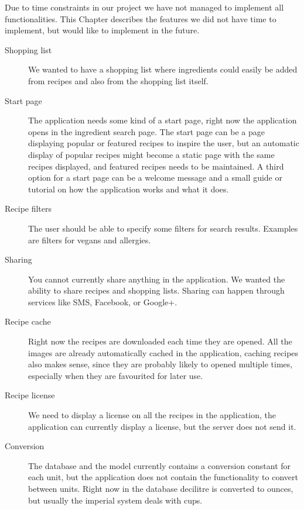 Due to time constraints in our project we have not managed to implement all functionalities. This Chapter describes the features we did not have time to implement, but would like to implement in the future.

\begin{description}
\item[Shopping list] We wanted to have a shopping list where ingredients could easily be added from recipes and also from the shopping list itself.

\item[Start page] The application needs some kind of a start page, right now the application opens in the ingredient search page. The start page can be a page displaying popular or featured recipes to inspire the user, but an automatic display of popular recipes might become a static page with the same recipes displayed, and featured recipes needs to be maintained. A third option for a start page can be a welcome message and a small guide or tutorial on how the application works and what it does.

\item[Recipe filters] The user should be able to specify some filters for search results. Examples are filters for vegans and allergies.

\item[Sharing] You cannot currently share anything in the application. We wanted the ability to share recipes and shopping lists. Sharing can happen through services like SMS, Facebook, or Google+.

\item[Recipe cache] Right now the recipes are downloaded each time they are opened. All the images are already automatically cached in the application, caching recipes also makes sense, since they are probably likely to opened multiple times, especially when they are favourited for later use.

\item[Recipe license] We need to display a license on all the recipes in the application, the application can currently display a license, but the server does not send it.

\item[Conversion] The database and the model currently contains a conversion constant for each unit, but the application does not contain the functionality to convert between units. Right now in the database decilitre is converted to ounces, but usually the imperial system deals with cups.


\end{description}
